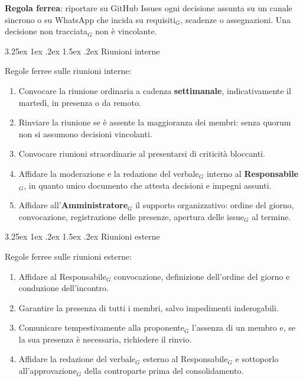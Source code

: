 \documentclass[a4paper, 10pt]{article}
\makeatletter
\renewcommand\paragraph{\@startsection{paragraph}{4}{\z@}%
  {3.25ex \@plus1ex \@minus .2ex}%
  {1.5ex \@plus .2ex}%
  {\normalfont\normalsize\bfseries}}
\makeatother
\begin{document}
\noindent \textbf{Regola ferrea}: riportare su GitHub Issues ogni decisione assunta su un canale sincrono o su WhatsApp che incida su requisiti$_G$, scadenze o assegnazioni. Una decisione non tracciata$_G$ non è vincolante.

\paragraph{Riunioni interne}

Regole ferree sulle riunioni interne:
\begin{enumerate}
    \item Convocare la riunione ordinaria a cadenza \textbf{settimanale}, indicativamente il martedì, in presenza o da remoto.
    \item Rinviare la riunione se è assente la maggioranza dei membri: senza quorum non si assumono decisioni vincolanti.
    \item Convocare riunioni straordinarie al presentarsi di criticità bloccanti.
    \item Affidare la moderazione e la redazione del verbale$_G$ interno al \textbf{Responsabile$_G$}, in quanto unico documento che attesta decisioni e impegni assunti.
    \item Affidare all'\textbf{Amministratore$_G$} il supporto organizzativo: ordine del giorno, convocazione, registrazione delle presenze, apertura delle issue$_G$ al termine.
\end{enumerate}

\paragraph{Riunioni esterne}

Regole ferree sulle riunioni esterne:
\begin{enumerate}
    \item Affidare al Responsabile$_G$ convocazione, definizione dell'ordine del giorno e conduzione dell'incontro.
    \item Garantire la presenza di tutti i membri, salvo impedimenti inderogabili.
    \item Comunicare tempestivamente alla proponente$_G$ l'assenza di un membro e, se la sua presenza è necessaria, richiedere il rinvio.
    \item Affidare la redazione del verbale$_G$ esterno al Responsabile$_G$ e sottoporlo all'approvazione$_G$ della controparte prima del consolidamento.
\end{enumerate}
\end{document}
